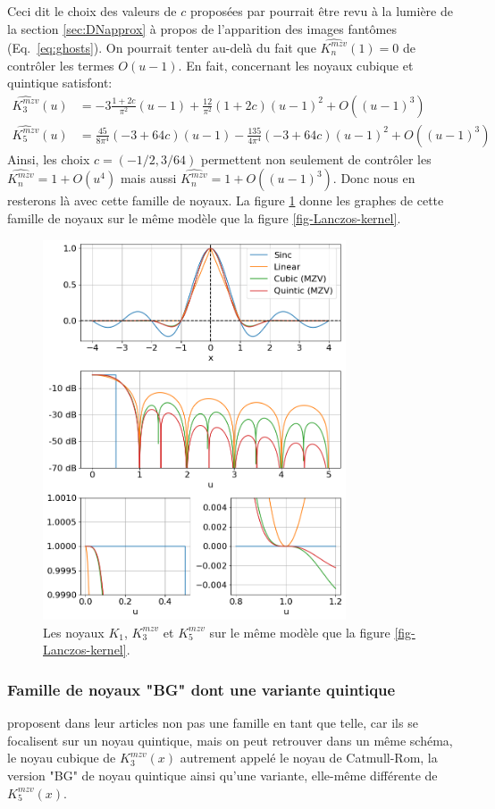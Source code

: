 \documentclass[11pt,twoside]{article}
\newcommand{\nn}{\nonumber}
\begin{document}
Ceci dit le choix des valeurs de $c$ proposées par \cite{Meijering1999} pourrait être revu à la lumière de la section \ref{sec:DNapprox} à propos de l'apparition des images fantômes (Eq.~\ref{eq:ghosts}). On pourrait tenter au-delà du fait que $\widehat{K^{mzv}_n}(1)=0$ de contrôler les termes $O(u-1)$. En fait, concernant les noyaux cubique et quintique satisfont:
\begin{align}
\widehat{K^{mzv}_3}(u) &= -3\frac{1+2c}{\pi^2} (u-1) + \frac{12}{\pi^2}(1+2c)(u-1)^2 + O((u-1)^3) \nn\\
\widehat{K^{mzv}_5}(u) &= \frac{45}{8\pi^4}(-3+64c) (u-1) -\frac{135}{4\pi^4}(-3+64c) (u-1)^2 + O((u-1)^3)
\end{align}
Ainsi, les choix $c=(-1/2,3/64)$ permettent non seulement de contrôler les $\widehat{K^{mzv}_n}=1+O(u^4)$ mais aussi $\widehat{K^{mzv}_n}=1+O((u-1)^3)$. Donc nous en resterons là avec cette famille de noyaux. La figure \ref{fig-mzv-kernel} donne les graphes de cette famille de noyaux sur le même modèle que la figure \ref{fig-Lanczos-kernel}. 
\begin{figure}
\centering
\includegraphics[width=0.8\textwidth]{fig6.png}
\caption{Les noyaux $K_1$, $K^{mzv}_3$ et $K^{mzv}_5$ sur le même modèle que la figure \ref{fig-Lanczos-kernel}.}
\label{fig-mzv-kernel}
\end{figure}
%
\subsubsection{Famille de noyaux "BG" dont une variante quintique}
% 
\cite{2014PASP..126..287B} proposent dans leur articles non pas une famille en tant que telle, car ils se focalisent sur un noyau quintique, mais on peut retrouver dans un même schéma, le noyau cubique de $K^{mzv}_3(x)$ autrement appelé le noyau de Catmull-Rom,  la version "BG" de noyau quintique ainsi qu'une variante, elle-même différente de $K^{mzv}_5(x)$.
\end{document}
